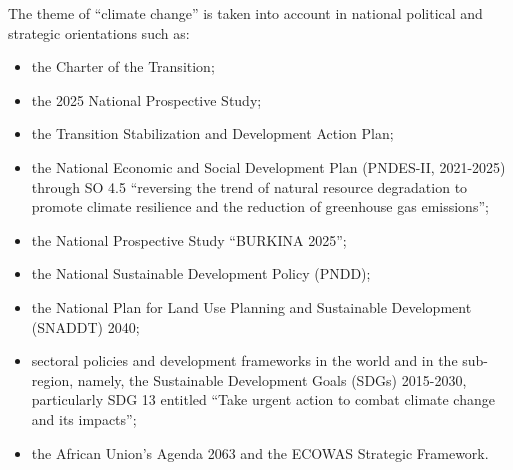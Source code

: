 \documentclass[
]{book}
\begin{document}
The theme of ``climate change'' is taken into account in national political and strategic orientations such as:

\begin{itemize}
\item
  the Charter of the Transition;
\item
  the 2025 National Prospective Study;
\item
  the Transition Stabilization and Development Action Plan;
\item
  the National Economic and Social Development Plan (PNDES-II, 2021-2025) through SO 4.5 ``reversing the trend of natural resource degradation to promote climate resilience and the reduction of greenhouse gas emissions'';
\item
  the National Prospective Study ``BURKINA 2025'';
\item
  the National Sustainable Development Policy (PNDD);
\item
  the National Plan for Land Use Planning and Sustainable Development (SNADDT) 2040;
\item
  sectoral policies and development frameworks in the world and in the sub-region, namely, the Sustainable Development Goals (SDGs) 2015-2030, particularly SDG 13 entitled ``Take urgent action to combat climate change and its impacts'';
\item
  the African Union's Agenda 2063 and the ECOWAS Strategic Framework.
\end{itemize}
\end{document}
